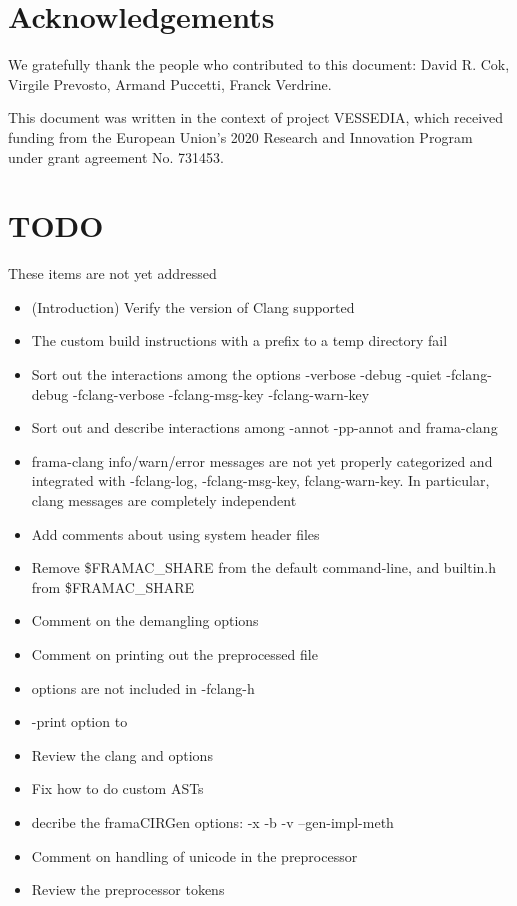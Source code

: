 \documentclass[web]{frama-c-book}
\begin{document}
\section*{Acknowledgements}

We gratefully thank the people who contributed to this document:
David R. Cok, Virgile Prevosto, Armand Puccetti, Franck Verdrine.

This document was written in the context of project VESSEDIA,
which received funding from the European Union's 2020
Research and Innovation Program under grant agreement
No. 731453.

\section*{TODO}

These items are not yet addressed
\begin{itemize}
\item (Introduction) Verify the version of Clang supported
\item The custom build instructions with a prefix to a temp directory fail
\item Sort out the interactions among the options -verbose -debug -quiet -fclang-debug -fclang-verbose -fclang-msg-key -fclang-warn-key
\item Sort out and describe interactions among -annot -pp-annot and frama-clang
\item frama-clang info/warn/error messages are not yet properly categorized and integrated with -fclang-log, -fclang-msg-key, fclang-warn-key. In particular, clang messages are completely independent
\item Add comments about using system header files
\item Remove \$FRAMAC\_SHARE from the default command-line, and builtin.h from \$FRAMAC\_SHARE
\item Comment on the demangling options
\item Comment on printing out the preprocessed file
\item \irg options are not included in -fclang-h
\item -print option to \irg
\item Review the clang and \irg options
\item Fix how to do custom ASTs
\item decribe the framaCIRGen options: -x -b -v --gen-impl-meth
\item Comment on handling of unicode in the preprocessor
\item Review the preprocessor tokens
\end{itemize}
\end{document}
